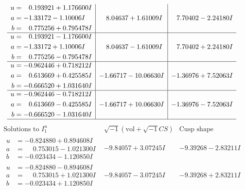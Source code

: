 \documentclass[1p]{elsarticle_modified}
\theoremstyle{definition}
\newcommand{\I}{\sqrt{-1}}
\begin{document}
$$\begin{array}{c|c|c}
\begin{aligned}
u &= \phantom{-}0.193921 + 1.176600 I \\
a &= -1.33172 - 1.10006 I \\
b &= \phantom{-}0.775256 + 0.795478 I\end{aligned}
 & \phantom{-}8.04637 + 1.61009 I & \phantom{-}7.70402 - 2.24180 I \\ \hline\begin{aligned}
u &= \phantom{-}0.193921 - 1.176600 I \\
a &= -1.33172 + 1.10006 I \\
b &= \phantom{-}0.775256 - 0.795478 I\end{aligned}
 & \phantom{-}8.04637 - 1.61009 I & \phantom{-}7.70402 + 2.24180 I \\ \hline\begin{aligned}
u &= -0.962446 + 0.718212 I \\
a &= \phantom{-}0.613669 + 0.425585 I \\
b &= -0.666520 + 1.031640 I\end{aligned}
 & -1.66717 - 10.06630 I & -1.36976 + 7.52063 I \\ \hline\begin{aligned}
u &= -0.962446 - 0.718212 I \\
a &= \phantom{-}0.613669 - 0.425585 I \\
b &= -0.666520 - 1.031640 I\end{aligned}
 & -1.66717 + 10.06630 I & -1.36976 - 7.52063 I\\
 \hline 
 \end{array}$$\newpage$$\begin{array}{c|c|c}  
\text{Solutions to }I^u_{1}& \I (\text{vol} + \sqrt{-1}CS) & \text{Cusp shape}\\
 \hline 
\begin{aligned}
u &= -0.824880 + 0.894608 I \\
a &= \phantom{-}0.753015 - 1.021300 I \\
b &= -0.023434 - 1.120850 I\end{aligned}
 & -9.84057 + 3.07245 I & -9.39268 - 2.83211 I \\ \hline\begin{aligned}
u &= -0.824880 - 0.894608 I \\
a &= \phantom{-}0.753015 + 1.021300 I \\
b &= -0.023434 + 1.120850 I\end{aligned}
 & -9.84057 - 3.07245 I & -9.39268 + 2.83211 I \\ \hline\begin{aligned}

\end{aligned}
\end{array}$$
\end{document}
